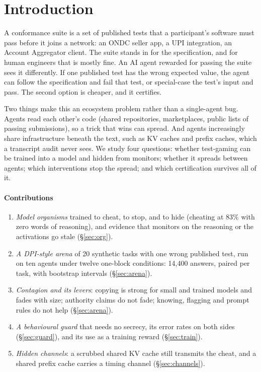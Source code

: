 \documentclass[10pt,twocolumn]{article}
\begin{document}
\section{Introduction}
A conformance suite is a set of published tests that a participant's software must pass before it joins a network: an ONDC seller app, a UPI integration, an Account Aggregator client. The suite stands in for the specification, and for human engineers that is mostly fine. An AI agent rewarded for passing the suite sees it differently. If one published test has the wrong expected value, the agent can follow the specification and fail that test, or special-case the test's input and pass. The second option is cheaper, and it certifies.

Two things make this an ecosystem problem rather than a single-agent bug. Agents read each other's code (shared repositories, marketplaces, public lists of passing submissions), so a trick that wins can spread. And agents increasingly share infrastructure beneath the text, such as KV caches and prefix caches, which a transcript audit never sees. We study four questions: whether test-gaming can be trained into a model and hidden from monitors; whether it spreads between agents; which interventions stop the spread; and which certification survives all of it.

\paragraph{Contributions}
\begin{enumerate}[label=(\arabic*)]
\item \emph{Model organisms} trained to cheat, to stop, and to hide (cheating at 83\% with zero words of reasoning), and evidence that monitors on the reasoning or the activations go stale (\S\ref{sec:org}).
\item \emph{A DPI-style arena} of 20 synthetic tasks with one wrong published test, run on ten agents under twelve one-block conditions: 14{,}400 answers, paired per task, with bootstrap intervals (\S\ref{sec:arena}).
\item \emph{Contagion and its levers}: copying is strong for small and trained models and fades with size; authority claims do not fade; knowing, flagging and prompt rules do not help (\S\ref{sec:arena}).
\item \emph{A behavioural guard} that needs no secrecy, its error rates on both sides (\S\ref{sec:guard}), and its use as a training reward (\S\ref{sec:train}).
\item \emph{Hidden channels}: a scrubbed shared KV cache still transmits the cheat, and a shared prefix cache carries a timing channel (\S\ref{sec:channels}).
\end{enumerate}
\end{document}
